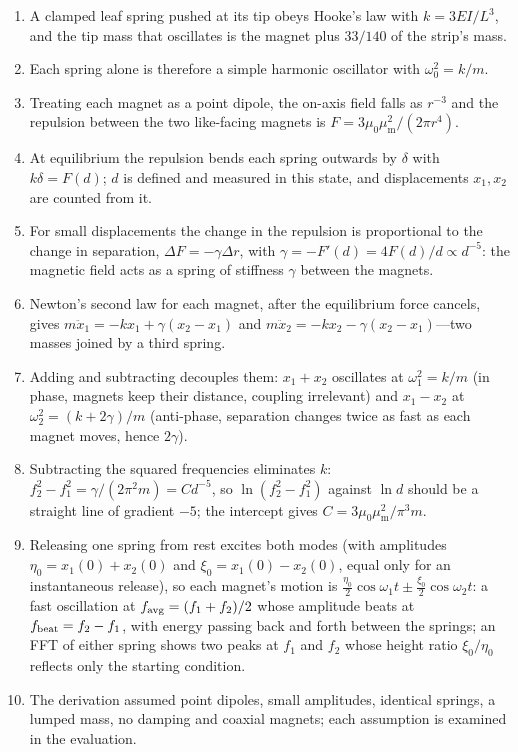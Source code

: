 \documentclass[11pt,a4paper]{article}
\newcommand{\muz}{\mu_0}
\newcommand{\mum}{\mu_{\mathrm m}}
\begin{document}
\begin{enumerate}[nosep,leftmargin=1.6em]
\item A clamped leaf spring pushed at its tip obeys Hooke's law with $k=3EI/L^3$, and the tip mass that oscillates is the magnet plus $33/140$ of the strip's mass.
\item Each spring alone is therefore a simple harmonic oscillator with $\omega_0^2=k/m$.
\item Treating each magnet as a point dipole, the on-axis field falls as $r^{-3}$ and the repulsion between the two like-facing magnets is $F=3\muz\mum^2/(2\pi r^4)$.
\item At equilibrium the repulsion bends each spring outwards by $\delta$ with $k\delta=F(d)$; $d$ is defined and measured in this state, and displacements $x_1,x_2$ are counted from it.
\item For small displacements the change in the repulsion is proportional to the change in separation, $\Delta F=-\gamma\Delta r$, with $\gamma=-F'(d)=4F(d)/d\propto d^{-5}$: the magnetic field acts as a spring of stiffness $\gamma$ between the magnets.
\item Newton's second law for each magnet, after the equilibrium force cancels, gives $m\ddot x_1=-kx_1+\gamma(x_2-x_1)$ and $m\ddot x_2=-kx_2-\gamma(x_2-x_1)$---two masses joined by a third spring.
\item Adding and subtracting decouples them: $x_1+x_2$ oscillates at $\omega_1^2=k/m$ (in phase, magnets keep their distance, coupling irrelevant) and $x_1-x_2$ at $\omega_2^2=(k+2\gamma)/m$ (anti-phase, separation changes twice as fast as each magnet moves, hence $2\gamma$).
\item Subtracting the squared frequencies eliminates $k$: $f_2^2-f_1^2=\gamma/(2\pi^2m)=Cd^{-5}$, so $\ln(f_2^2-f_1^2)$ against $\ln d$ should be a straight line of gradient $-5$; the intercept gives $C=3\muz\mum^2/\pi^3m$.
\item Releasing one spring from rest excites both modes (with amplitudes $\eta_0=x_1(0)+x_2(0)$ and $\xi_0=x_1(0)-x_2(0)$, equal only for an instantaneous release), so each magnet's motion is $\frac{\eta_0}{2}\cos\omega_1t\pm\frac{\xi_0}{2}\cos\omega_2t$: a fast oscillation at $f_{\rm avg}=(f_1+f_2)/2$ whose amplitude beats at $f_{\rm beat}=f_2-f_1$, with energy passing back and forth between the springs; an FFT of either spring shows two peaks at $f_1$ and $f_2$ whose height ratio $\xi_0/\eta_0$ reflects only the starting condition.
\item The derivation assumed point dipoles, small amplitudes, identical springs, a lumped mass, no damping and coaxial magnets; each assumption is examined in the evaluation.
\end{enumerate}
\end{document}
